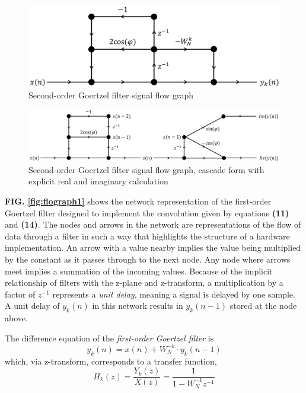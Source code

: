 \documentclass[reprint,amsmath,amssymb,aps,pra]{revtex4-2}
\begin{document}
\begin{figure}[t]
    \centering
    \includegraphics[width=0.7\linewidth]{figs/goertzel_network2.png}
    \caption{Second-order Goertzel filter signal flow graph}
    \label{fig:flograph2}
\end{figure}

\begin{figure}[t]
    \centering
    \includegraphics[width=\linewidth]{figs/goertzel_cascade.png}
    \caption{Second-order Goertzel filter signal flow graph, cascade form with explicit real and imaginary calculation}
    \label{fig:flograph3}
\end{figure}

\textbf{FIG. \ref{fig:flograph1}} shows the network representation of the first-order Goertzel filter designed to implement the convolution given by equations \textbf{(11)} and \textbf{(14)}. The nodes and arrows in the network are representations of the flow of data through a filter in such a way that highlights the structure of a hardware implementation. An arrow with a value nearby implies the value being multiplied by the constant as it passes through to the next node. Any node where arrows meet implies a summation of the incoming values. Because of the implicit relationship of filters with the z-plane and z-transform, a multiplication by a factor of $z^{-1}$ represents a \textit{unit delay}, meaning a signal is delayed by one sample. A unit delay of $y_k(n)$ in this network results in $y_k(n-1)$ stored at the node above.

The difference equation of the \textit{first-order Goertzel filter} is
\begin{equation}
    y_k(n) = x(n) + W_N^{-k}\cdot y_k(n-1)
\end{equation}
which, via z-transform, corresponds to a transfer function,
\begin{equation}
    H_k(z) = \frac{Y_k(z)}{X(z)} = \frac{1}{1-W_N^{-k}z^{-1}}
\end{equation}
\end{document}
